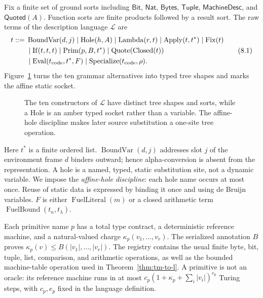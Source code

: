 Fix a finite set of ground sorts including \(\mathsf{Bit}\),
\(\mathsf{Nat}\), \(\mathsf{Bytes}\), \(\mathsf{Tuple}\),
\(\mathsf{MachineDesc}\), and \(\mathsf{Quoted}(A)\).  Function sorts are
finite products followed by a result sort.  The raw terms of the description
language \(\mathcal L\) are
\[
\begin{split}
t ::= {}& \operatorname{BoundVar}(d,j)
 \mid \operatorname{Hole}(h,A)
 \mid \operatorname{Lambda}(r,t)
 \mid \operatorname{Apply}(t,t^*)
 \mid \operatorname{Fix}(t)\\
&\mid \operatorname{If}(t,t,t)
 \mid \operatorname{Prim}(p,B,t^*)
 \mid \operatorname{Quote}(\operatorname{Closed}(t))\\
&\mid \operatorname{Eval}(t_{\rm code},t^*,F)
 \mid \operatorname{Specialize}(t_{\rm code},\rho).
\end{split}
\tag{8.1}\label{eq:l-grammar}
\]
Figure~\ref{fig:l-grammar-gallery} turns the ten grammar alternatives into
typed tree shapes and marks the affine static socket.
\begin{figure}[t]
\centering

\caption{The ten constructors of \(\mathcal L\) have distinct tree shapes and sorts, while a Hole is an amber typed socket rather than a variable.  The affine-hole discipline makes later source substitution a one-site tree operation.}
\label{fig:l-grammar-gallery}
\end{figure}
Here \(t^*\) is a finite ordered list.  \(\operatorname{BoundVar}(d,j)\)
addresses slot \(j\) of the environment frame \(d\) binders outward; hence
alpha-conversion is absent from the representation.  A hole is a named,
typed, static substitution site, not a dynamic variable.  We impose the
\emph{affine-hole discipline}: each hole name occurs at most once.  Reuse of
static data is expressed by binding it once and using de Bruijn variables.
\(F\) is either \(\operatorname{FuelLiteral}(m)\) or a closed arithmetic term
\(\operatorname{FuelBound}(t_n,t_\lambda)\).

Each primitive name \(p\) has a total type contract, a deterministic reference
machine, and a natural-valued charge \(\kappa_p(v_1,\ldots,v_r)\).  The
serialized annotation \(B\) proves
\(\kappa_p(v)\leq B(|v_1|,\ldots,|v_r|)\).  The registry contains the usual
finite byte, bit, tuple, list, comparison, and arithmetic operations, as well
as the bounded machine-table operation used in
Theorem~\ref{thm:tm-to-l}.  A primitive is not an oracle: its reference
machine runs in at most
\(c_p(1+\kappa_p+\sum_i|v_i|)^{e_p}\) Turing steps, with \(c_p,e_p\) fixed in
the language definition.

